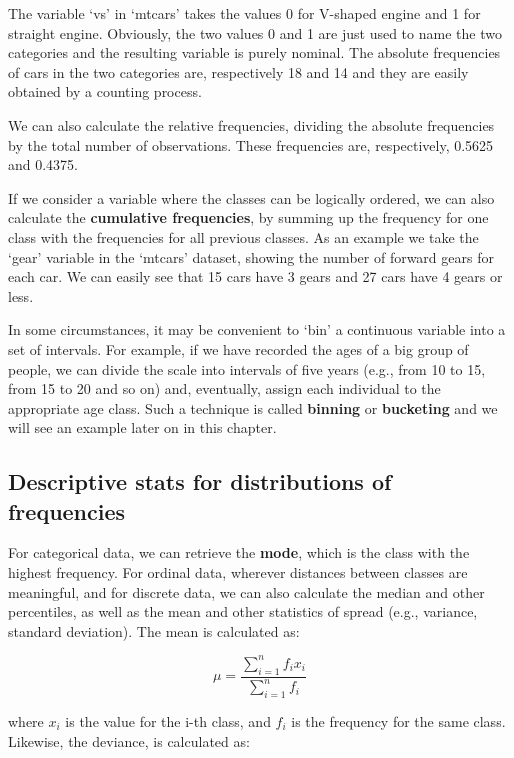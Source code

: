 \documentclass[a4paper,12pt,oneside]{book}
\begin{document}
The variable `vs' in `mtcars' takes the values 0 for V-shaped engine and 1 for straight engine. Obviously, the two values 0 and 1 are just used to name the two categories and the resulting variable is purely nominal. The absolute frequencies of cars in the two categories are, respectively 18 and 14 and they are easily obtained by a counting process.

We can also calculate the relative frequencies, dividing the absolute frequencies by the total number of observations. These frequencies are, respectively, 0.5625 and 0.4375.

If we consider a variable where the classes can be logically ordered, we can also calculate the \textbf{cumulative frequencies}, by summing up the frequency for one class with the frequencies for all previous classes. As an example we take the `gear' variable in the `mtcars' dataset, showing the number of forward gears for each car. We can easily see that 15 cars have 3 gears and 27 cars have 4 gears or less.

In some circumstances, it may be convenient to `bin' a continuous variable into a set of intervals. For example, if we have recorded the ages of a big group of people, we can divide the scale into intervals of five years (e.g., from 10 to 15, from 15 to 20 and so on) and, eventually, assign each individual to the appropriate age class. Such a technique is called \textbf{binning} or \textbf{bucketing} and we will see an example later on in this chapter.

\hypertarget{descriptive-stats-for-distributions-of-frequencies}{%
\subsection{Descriptive stats for distributions of frequencies}\label{descriptive-stats-for-distributions-of-frequencies}}

For categorical data, we can retrieve the \textbf{mode}, which is the class with the highest frequency. For ordinal data, wherever distances between classes are meaningful, and for discrete data, we can also calculate the median and other percentiles, as well as the mean and other statistics of spread (e.g., variance, standard deviation). The mean is calculated as:

\[ \mu = \frac{\sum\limits_{i = 1}^n f_i x_i}{\sum\limits_{i = 1}^n f_i}\]

where \(x_i\) is the value for the i-th class, and \(f_i\) is the frequency for the same class. Likewise, the deviance, is calculated as:
\end{document}
